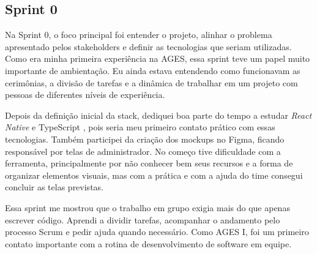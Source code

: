 \subsection{Sprint 0}

Na Sprint 0, o foco principal foi entender o projeto, alinhar o problema apresentado pelos stakeholders e definir as tecnologias que seriam utilizadas. Como era minha primeira experiência na AGES, essa sprint teve um papel muito importante de ambientação. Eu ainda estava entendendo como funcionavam as cerimônias, a divisão de tarefas e a dinâmica de trabalhar em um projeto com pessoas de diferentes níveis de experiência.

Depois da definição inicial da stack, dediquei boa parte do tempo a estudar \textit{React Native} \cite{reactnative} e TypeScript \cite{typescript}, pois seria meu primeiro contato prático com essas tecnologias. Também participei da criação dos mockups no Figma, ficando responsável por telas de administrador. No começo tive dificuldade com a ferramenta, principalmente por não conhecer bem seus recursos e a forma de organizar elementos visuais, mas com a prática e com a ajuda do time consegui concluir as telas previstas.

Essa sprint me mostrou que o trabalho em grupo exigia mais do que apenas escrever código. Aprendi a dividir tarefas, acompanhar o andamento pelo processo Scrum e pedir ajuda quando necessário. Como AGES I, foi um primeiro contato importante com a rotina de desenvolvimento de software em equipe.
